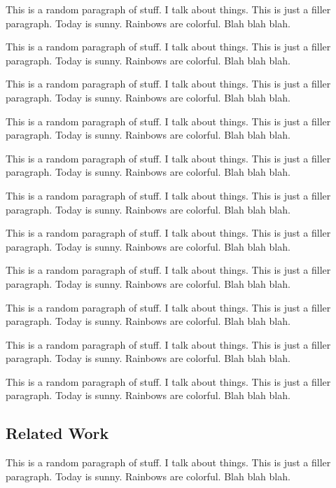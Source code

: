 \documentclass{article}
\begin{document}
		{\color{BurntOrange} This is a random paragraph of stuff. I talk about things. This is just a filler paragraph. Today is sunny. Rainbows are colorful. Blah blah blah.}
			
		{\color{BurntOrange} This is a random paragraph of stuff. I talk about things. This is just a filler paragraph. Today is sunny. Rainbows are colorful. Blah blah blah.}
		
		{\color{BurntOrange} This is a random paragraph of stuff. I talk about things. This is just a filler paragraph. Today is sunny. Rainbows are colorful. Blah blah blah.}
		
		{\color{BurntOrange} This is a random paragraph of stuff. I talk about things. This is just a filler paragraph. Today is sunny. Rainbows are colorful. Blah blah blah.}
		
		{\color{BurntOrange} This is a random paragraph of stuff. I talk about things. This is just a filler paragraph. Today is sunny. Rainbows are colorful. Blah blah blah.}
		
		{\color{BurntOrange} This is a random paragraph of stuff. I talk about things. This is just a filler paragraph. Today is sunny. Rainbows are colorful. Blah blah blah.}
		
		{\color{BurntOrange} This is a random paragraph of stuff. I talk about things. This is just a filler paragraph. Today is sunny. Rainbows are colorful. Blah blah blah.}
		
		{\color{BurntOrange} This is a random paragraph of stuff. I talk about things. This is just a filler paragraph. Today is sunny. Rainbows are colorful. Blah blah blah.}
		
		{\color{BurntOrange} This is a random paragraph of stuff. I talk about things. This is just a filler paragraph. Today is sunny. Rainbows are colorful. Blah blah blah.}
		
		{\color{BurntOrange} This is a random paragraph of stuff. I talk about things. This is just a filler paragraph. Today is sunny. Rainbows are colorful. Blah blah blah.}
		
		{\color{BurntOrange} This is a random paragraph of stuff. I talk about things. This is just a filler paragraph. Today is sunny. Rainbows are colorful. Blah blah blah.}
		
	\subsection{Related Work}
	
		{\color{BurntOrange} This is a random paragraph of stuff. I talk about things. This is just a filler paragraph. Today is sunny. Rainbows are colorful. Blah blah blah.}
		
\end{document}
